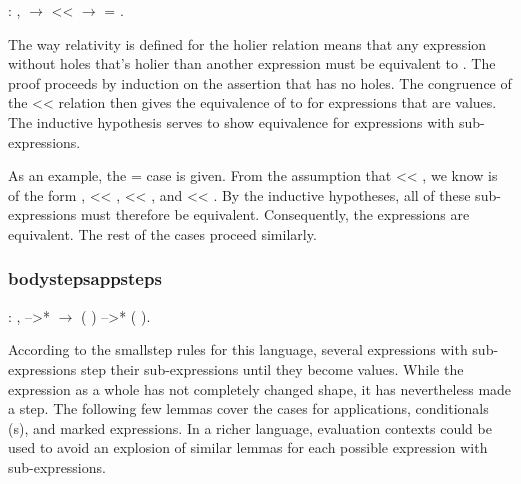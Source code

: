 \documentclass[12pt]{report}
\begin{document}
\begin{coqdoccode}
\coqdocemptyline
\coqdocindent{1.00em}
  : \coqdockw{\ensuremath{\forall}}  ,\coqdoceol
\coqdocindent{2.00em}
  \ensuremath{\rightarrow}\coqdoceol
\coqdocindent{2.00em}
 <<  \ensuremath{\rightarrow}\coqdoceol
\coqdocindent{2.00em}
 = .\coqdoceol
\coqdocemptyline
\end{coqdoccode}
The way relativity is defined for the holier relation means that
any expression without holes  that's holier than another
expression  must be equivalent to .  The proof proceeds by
induction on the assertion that  has no holes. The congruence of
the << relation then gives the equivalence of  to  for
expressions that are values. The inductive hypothesis serves to show
equivalence for expressions with sub-expressions. 

 As an example, the  =     case is given.  From the
assumption that     << , we know  is of the form
   ,  << ,  << , and  <<
. By the inductive hypotheses, all of these sub-expressions must
therefore be equivalent. Consequently, the  expressions are
equivalent. The rest of the cases proceed similarly. 

\subsubsection{bodystepsappsteps}

\begin{coqdoccode}
\coqdocemptyline
\coqdocindent{1.00em}
  : \coqdockw{\ensuremath{\forall}}   ,\coqdoceol
\coqdocindent{2.00em}
 -->*  \ensuremath{\rightarrow}\coqdoceol
\coqdocindent{2.00em}
(  ) -->* (  ).\coqdoceol
\coqdocemptyline
\end{coqdoccode}
According to the smallstep rules for this language, several
expressions with sub-expressions step their sub-expressions until they
become values. While the expression as a whole has not completely
changed shape, it has nevertheless made a step. The following few
lemmas cover the cases for applications, conditionals (s), and
marked expressions. In a richer language, evaluation contexts could
be used to avoid an explosion of similar lemmas for each possible
expression with sub-expressions. 
\end{document}
